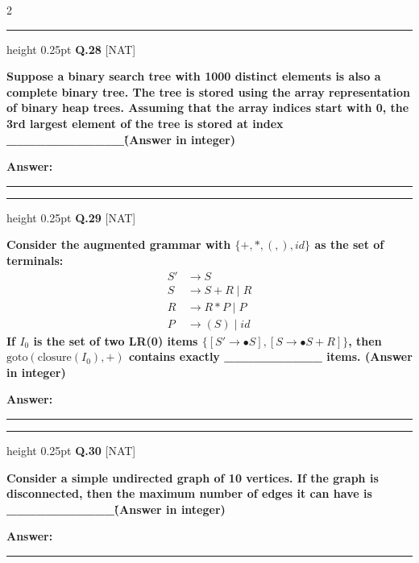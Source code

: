 \documentclass[a4paper,10pt,twoside]{article}
\begin{document}
\begin{multicols}{2}
\par\vspace{6pt}\hrule height 0.25pt\vspace{6pt}
\noindent\textbf{Q.28} \hfill {\footnotesize\textsf{[NAT]}}
\par\vspace{2pt}
{\bfseries Suppose a binary search tree with 1000 distinct elements is also a complete binary tree. The tree is stored using the array representation of binary heap trees. Assuming that the array indices start with 0, the 3rd largest element of the tree is stored at index \_\_\_\_\_\_\_\_\_\_\_\_\. (Answer in integer) \par}
\par\vspace{3pt}\noindent\textbf{Answer:} \rule{3.2cm}{0.4pt}
\par\vspace{6pt}\hrule height 0.25pt\vspace{6pt}
\noindent\textbf{Q.29} \hfill {\footnotesize\textsf{[NAT]}}
\par\vspace{2pt}
{\bfseries Consider the augmented grammar with $\{+, *, (, ), id\}$ as the set of terminals:
\begin{align*}
S' &\to S \\
S &\to S + R \mid R \\
R &\to R * P \mid P \\
P &\to ( S ) \mid id
\end{align*}
If $I_0$ is the set of two LR(0) items $\{[S' \to \bullet S], [S \to \bullet S + R]\}$, then $\text{goto}(\text{closure}(I_0), +)$ contains exactly \_\_\_\_\_\_\_\_\_\_ items. (Answer in integer) \par}
\par\vspace{3pt}\noindent\textbf{Answer:} \rule{3.2cm}{0.4pt}
\par\vspace{6pt}\hrule height 0.25pt\vspace{6pt}
\noindent\textbf{Q.30} \hfill {\footnotesize\textsf{[NAT]}}
\par\vspace{2pt}
{\bfseries Consider a simple undirected graph of 10 vertices. If the graph is disconnected, then the maximum number of edges it can have is \_\_\_\_\_\_\_\_\_\_\_\. (Answer in integer) \par}
\par\vspace{3pt}\noindent\textbf{Answer:} \rule{3.2cm}{0.4pt}

\end{multicols}
\end{document}
